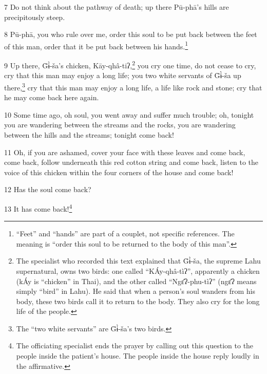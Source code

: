 7 Do not think about the pathway of death; up there Pū-phā's hills are precipitously
steep.

8 Pū-phā, you who rule over me, order this soul to be put back between the
feet of this man, order that it be put back between his hands.\footnote{``Feet'' and ``hands'' are part of a couplet, not specific references. The meaning is ``order this soul to be returned to the body of this man''.}

9 Up there, G̈ɨ̀-ša's chicken, Kāy-qhâ-tiʔ,\footnote{The specialist who recorded this text explained that G̈ɨ̀-ša, the supreme Lahu supernatural, owns two birds: one called ``KÁy-qhâ-tìʔ'', apparently a chicken (kÁy is ``chicken'' in Thai), and the other called ``Ngɛ̂ʔ-phu-tìʔ'' (ngɛ̂ʔ means simply ``bird'' in Lahu). He said that when a person's soul wanders from his body, these two birds call it to return to the body. They also cry for the long life of the people.} you cry one time, do not
cease to cry, cry that this man may enjoy a long life; you two white servants of
G̈ɨ̀-ša up there,\footnote{The ``two white servants'' are G̈ɨ̀-ša's two birds.} cry that this man may enjoy a long life, a life like
rock and stone; cry that he may come back here again.

10 Some time ago, oh soul, you went away and suffer much trouble; oh, tonight you
are wandering between the streams and the rocks, you are wandering between the
hills and the streams; tonight come back!

11 Oh, if you are ashamed, cover your face with these leaves and come back, come
back, follow underneath this red cotton string and come back, listen to the voice
of this chicken within the four corners of the house and come back!

12 Has the soul come back?

13 It has come back!\footnote{The officiating specialist ends the prayer by calling out this question to the people inside the patient's house. The people inside the house reply loudly in the affirmative.}

